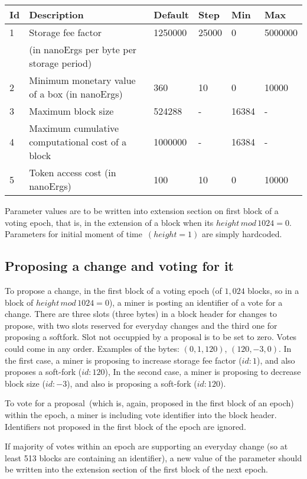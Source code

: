 \begin{tabular}{| l | l | l | l | l | l |}
\hline
Id & Description & Default & Step & Min & Max \\
\hline
\hline
1 & Storage fee factor  & 1250000 & 25000 & 0 & 5000000 \\
  &  (in nanoErgs per byte per storage period) & & & & \\
\hline
2 & Minimum monetary value of a box (in nanoErgs) & 360 & 10 & 0 & 10000 \\
\hline
3 & Maximum block size & 524288 & - & 16384 & - \\
\hline
4 & Maximum cumulative computational cost of a block & 1000000 & - & 16384 & - \\
\hline
5 & Token access cost (in nanoErgs) & 100 & 10 & 0 & 10000 \\
\end{tabular}

Parameter values are to be written into extension section on first block of a voting epoch,
that is, in the extension of a block when its $height\,mod\,1024 = 0$.
Parameters for initial moment of time~$(height = 1)$ are simply hardcoded.

\subsection{Proposing a change and voting for it}

To propose a change, in the first block of a voting epoch (of $1,024$ blocks, so in a block of
$height\,mod\,1024 = 0$), a miner is posting an identifier of a vote for a change. There are three slots (three bytes)
in a block header for changes to propose, with two slots reserved for everyday changes and the third one for
proposing a softfork. Slot not occuppied by a proposal is to be set to zero. Votes could come in any order.
Examples of the bytes: $(0, 1, 120)$, $(120, -3, 0)$. In the first case, a miner is proposing to increase storage fee factor ($id:1$), and
also proposes a soft-fork ($id:120$), In the second case, a miner is proposing to decrease block size ($id:-3$), and also
 is proposing a soft-fork ($id:120$).

To vote for a proposal~(which is, again, proposed in the first block of an epoch) within the epoch, a miner is including vote identifier
into the block header. Identifiers not proposed in the first block of the epoch are ignored.

If majority of votes within an epoch are supporting an everyday change (so at least 513 blocks are containing an
identifier), a new value of the parameter should be written into the extension section of the first block of the next
epoch.

